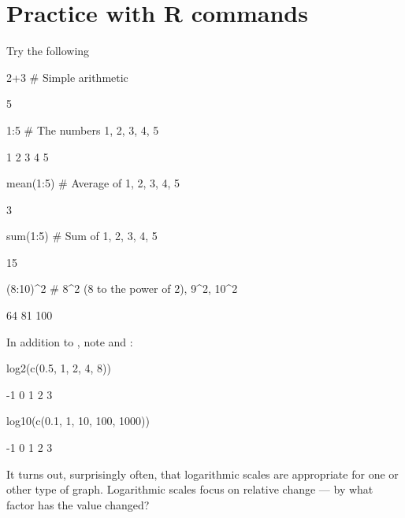 \section{Practice with R commands}
Try the following
\begin{Schunk}
\begin{Sinput}
2+3        # Simple arithmetic
\end{Sinput}
\begin{Soutput}
[1] 5
\end{Soutput}
\begin{Sinput}
1:5        # The numbers 1, 2, 3, 4, 5
\end{Sinput}
\begin{Soutput}
[1] 1 2 3 4 5
\end{Soutput}
\begin{Sinput}
mean(1:5)  # Average of 1, 2, 3, 4, 5
\end{Sinput}
\begin{Soutput}
[1] 3
\end{Soutput}
\begin{Sinput}
sum(1:5)   # Sum of 1, 2, 3, 4, 5
\end{Sinput}
\begin{Soutput}
[1] 15
\end{Soutput}
\begin{Sinput}
(8:10)^2   # 8^2 (8 to the power of 2), 9^2, 10^2
\end{Sinput}
\begin{Soutput}
[1]  64  81 100
\end{Soutput}
\end{Schunk}

In addition to , note  and :
\begin{Schunk}
\begin{Sinput}
log2(c(0.5, 1, 2, 4, 8))
\end{Sinput}
\begin{Soutput}
[1] -1  0  1  2  3
\end{Soutput}
\begin{Sinput}
log10(c(0.1, 1, 10, 100, 1000))
\end{Sinput}
\begin{Soutput}
[1] -1  0  1  2  3
\end{Soutput}
\end{Schunk}
\noindent
It turns out, surprisingly often, that logarithmic scales are
appropriate for one or other type of graph.  Logarithmic scales focus
on relative change --- by what factor has the value changed?

